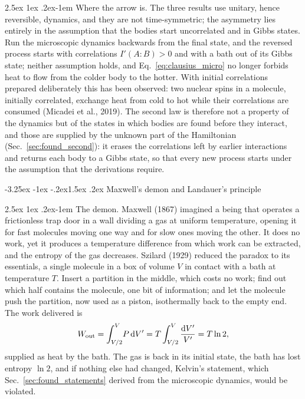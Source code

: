 \documentclass[10pt,a4paper]{article}
\makeatletter
\renewcommand{\subsection}{\@startsection{subsection}{2}{\z@}%
  {-3.25ex \@plus -1ex \@minus -.2ex}{1.5ex \@plus .2ex}%
  {\normalfont\fontsize{15.5pt}{19pt}\selectfont\bfseries}}
\renewcommand{\paragraph}{\@startsection{paragraph}{4}{\z@}%
  {2.5ex \@plus 1ex \@minus .2ex}{-1em}%
  {\normalfont\fontsize{14pt}{17pt}\selectfont\bfseries}}
\newcommand{\dd}{\mathrm{d}}
\makeatother
\begin{document}
\paragraph{Where the arrow is.}
The three results use unitary, hence reversible, dynamics, and they are not time-symmetric; the asymmetry lies entirely in the assumption that the bodies start uncorrelated and in Gibbs states.
Run the microscopic dynamics backwards from the final state, and the reversed process starts with correlations $ I'(A{:}B) > 0 $ and with a bath out of its Gibbs state; neither assumption holds, and Eq.~\eqref{eq:clausius_micro} no longer forbids heat to flow from the colder body to the hotter.
With initial correlations prepared deliberately this has been observed: two nuclear spins in a molecule, initially correlated, exchange heat from cold to hot while their correlations are consumed (Micadei et al., 2019).
The second law is therefore not a property of the dynamics but of the states in which bodies are found before they interact, and those are supplied by the unknown part of the Hamiltonian (Sec.~\ref{sec:found_second}): it erases the correlations left by earlier interactions and returns each body to a Gibbs state, so that every new process starts under the assumption that the derivations require.

\subsection{Maxwell's demon and Landauer's principle}
\label{sec:found_demon}

\paragraph{The demon.}
Maxwell (1867) imagined a being that operates a frictionless trap door in a wall dividing a gas at uniform temperature, opening it for fast molecules moving one way and for slow ones moving the other.
It does no work, yet it produces a temperature difference from which work can be extracted, and the entropy of the gas decreases.
Szilard (1929) reduced the paradox to its essentials, a single molecule in a box of volume $ V $ in contact with a bath at temperature $ T $.
Insert a partition in the middle, which costs no work; find out which half contains the molecule, one bit of information; and let the molecule push the partition, now used as a piston, isothermally back to the empty end.
The work delivered is
\[
  W_{\rm out} = \int_{V/2}^{V}\!P\,\dd V' = T\int_{V/2}^{V}\frac{\dd V'}{V'} = T\ln2 ,
\]
supplied as heat by the bath.
The gas is back in its initial state, the bath has lost entropy $ \ln2 $, and if nothing else had changed, Kelvin's statement, which Sec.~\ref{sec:found_statements} derived from the microscopic dynamics, would be violated.
\end{document}
